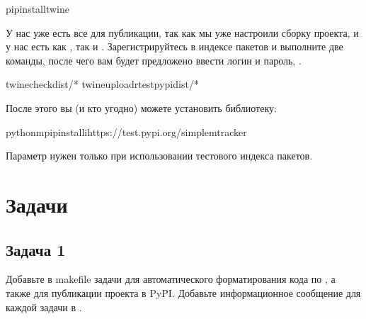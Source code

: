 \documentclass[letterpaper,10pt,russian]{sphinxmanual}
\begin{document}
\begin{sphinxVerbatim}[commandchars=\\\{\}]
pipinstalltwine
\end{sphinxVerbatim}

\sphinxAtStartPar
У нас уже есть все для публикации, так как мы уже настроили сборку проекта, и у нас есть как , так и . Зарегистрируйтесь в  индексе пакетов и выполните две команды, после чего вам будет предложено ввести логин и пароль, .

\begin{sphinxVerbatim}[commandchars=\\\{\}]
twinecheckdist/*
twineupload\PYGZhy{}rtestpypidist/*
\end{sphinxVerbatim}

\sphinxAtStartPar
После этого вы (и кто угодно) можете установить библиотеку:

\begin{sphinxVerbatim}[commandchars=\\\{\}]
python\PYGZhy{}mpipinstall\PYGZhy{}ihttps://test.pypi.org/simplemtracker
\end{sphinxVerbatim}

\sphinxAtStartPar
Параметр  нужен только при использовании тестового индекса пакетов.

\sphinxstepscope


\section{Задачи}
\label{\detokenize{educational_materials/packaging/exercises:id1}}\label{\detokenize{educational_materials/packaging/exercises::doc}}

\subsection{Задача 1}
\label{\detokenize{educational_materials/packaging/exercises:id2}}
\sphinxAtStartPar
Добавьте в makefile задачи для автоматического форматирования кода по , а также для публикации проекта в PyPI. Добавьте информационное сообщение для каждой задачи в .
\end{document}
